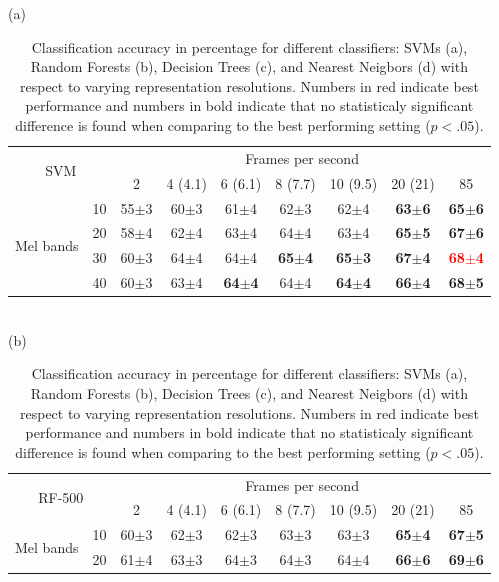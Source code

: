 \documentclass[sensors,article,submit,moreauthors,pdftex,10pt,a4paper]{mdpi}
\begin{document}
\begin{table}[h]
\centering
\caption{Classification accuracy in percentage for different classifiers: SVMs (a), Random Forests (b), Decision Trees (c), and Nearest Neigbors (d) with respect to varying representation resolutions. Numbers in red indicate best performance and numbers in bold indicate that no statisticaly significant difference is found when comparing to the best performing setting ($p<.05$).}
\label{T2}
(a)\\
\begin{tabular}{ll|c|c|c|c|c|c|c|}
\cline{3-9}
\multicolumn{2}{c}{\multirow{2}{*}{SVM}} & \multicolumn{7}{|c|}{Frames per second}\\ \cline{3-9}
 & & 2 & 4 (4.1) & 6 (6.1) & 8 (7.7) & 10 (9.5) & 20 (21) & 85 \\ \cline{1-9}
\multicolumn{1}{|c}{\multirow{4}{*}{Mel bands}}
 & \multicolumn{1}{|c|}{10} & 55$\pm$3 & 60$\pm$3 & 61$\pm$4 & 62$\pm$3 & 62$\pm$4 & \textbf{63$\pm$6} & \textbf{65$\pm$6} \\ \cline{2-9}
\multicolumn{1}{|c}{}
 & \multicolumn{1}{|c|}{20} & 58$\pm$4 & 62$\pm$4 & 63$\pm$4 & 64$\pm$4 & 63$\pm$4 & \textbf{65$\pm$5} & \textbf{67$\pm$6} \\ \cline{2-9}
\multicolumn{1}{|c}{}
 & \multicolumn{1}{|c|}{30} & 60$\pm$3 & 64$\pm$4 & 64$\pm$4 & \textbf{65$\pm$4} & \textbf{65$\pm$3} & \textbf{67$\pm$4} & \textbf{\textcolor{red}{68$\pm$4}} \\ \cline{2-9}
\multicolumn{1}{|c}{}
 & \multicolumn{1}{|c|}{40} & 60$\pm$3 & 63$\pm$4 & \textbf{64$\pm$4} & 64$\pm$4 & \textbf{64$\pm$4} & \textbf{66$\pm$4} & \textbf{68$\pm$5} \\ \cline{1-9}
\end{tabular}
\\(b)\\
\begin{tabular}{ll|c|c|c|c|c|c|c|}
\cline{3-9}
\multicolumn{2}{c}{\multirow{2}{*}{RF-500}} & \multicolumn{7}{|c|}{Frames per second}\\ \cline{3-9}
 & & 2 & 4 (4.1) & 6 (6.1) & 8 (7.7) & 10 (9.5) & 20 (21) & 85 \\ \cline{1-9}
\multicolumn{1}{|c}{\multirow{4}{*}{Mel bands}}
 & \multicolumn{1}{|c|}{10} & 60$\pm$3 & 62$\pm$3 & 62$\pm$3 & 63$\pm$3 & 63$\pm$3 & \textbf{65$\pm$4} & \textbf{67$\pm$5} \\ \cline{2-9}
\multicolumn{1}{|c}{}
 & \multicolumn{1}{|c|}{20} & 61$\pm$4 & 63$\pm$3 & 64$\pm$3 & 64$\pm$3 & 64$\pm$4 & \textbf{66$\pm$6} & \textbf{69$\pm$6} \\ \cline{2-9}

\end{tabular}
\end{table}
\end{document}
